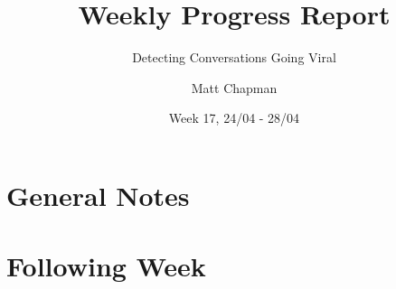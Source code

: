 \documentclass{mattreport}
\title{Weekly Progress Report}
\subtitle{Detecting Conversations Going Viral}
\date{Week 17, 24/04 - 28/04}
\author{Matt Chapman}
\begin{document}
\maketitle

\section{General Notes}


\section{Following Week}


\newpage
\printbibliography
\end{document}
